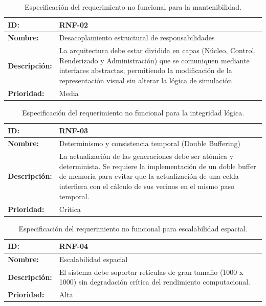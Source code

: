 \begin{table}[ht]
\centering
\begin{tabular}{|l|p{10cm}|}
\hline
\textbf{ID:} & \textbf{RNF-02} \\ \hline
\textbf{Nombre:} & Desacoplamiento estructural de responsabilidades \\ \hline
\textbf{Descripción:} & La arquitectura debe estar dividida en capas (Núcleo, Control, Renderizado y Administración) que se comuniquen mediante interfaces abstractas, permitiendo la modificación de la representación visual sin alterar la lógica de simulación. \\ \hline
\textbf{Prioridad:} & Media \\ \hline
\end{tabular}
\caption{Especificación del requerimiento no funcional para la mantenibilidad.}
\label{tab:rnf02}
\end{table}

\begin{table}[ht]
\centering
\begin{tabular}{|l|p{10cm}|}
\hline
\textbf{ID:} & \textbf{RNF-03} \\ \hline
\textbf{Nombre:} & Determinismo y consistencia temporal (Double Buffering) \\ \hline
\textbf{Descripción:} & La actualización de las generaciones debe ser atómica y determinista. Se requiere la implementación de un doble buffer de memoria para evitar que la actualización de una celda interfiera con el cálculo de sus vecinos en el mismo paso temporal. \\ \hline
\textbf{Prioridad:} & Crítica \\ \hline
\end{tabular}
\caption{Especificación del requerimiento no funcional para la integridad lógica.}
\label{tab:rnf03}
\end{table}

\begin{table}[H]
\centering
\begin{tabular}{|l|p{10cm}|}
\hline
\textbf{ID:} & \textbf{RNF-04} \\ \hline
\textbf{Nombre:} & Escalabilidad espacial \\ \hline
\textbf{Descripción:} & El sistema debe soportar retículas de gran tamaño (1000 x 1000) sin degradación crítica del rendimiento computacional. \\ \hline
\textbf{Prioridad:} & Alta \\ \hline
\end{tabular}
\caption{Especificación del requerimiento no funcional para escalabilidad espacial.}
\label{tab:rnf04}
\end{table}

